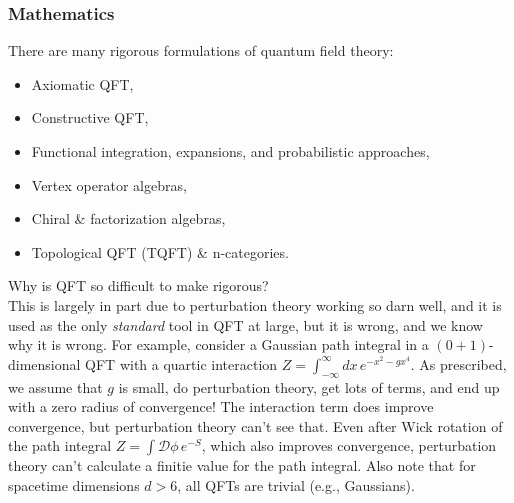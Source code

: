 \subsubsection*{Mathematics}

\noindent There are many rigorous formulations of quantum field theory:

\begin{itemize}
\item Axiomatic QFT,
\item Constructive QFT,
\item Functional integration, expansions, and probabilistic approaches,
\item Vertex operator algebras,
\item Chiral \& factorization algebras,
\item Topological QFT (TQFT) \& n-categories.
\end{itemize}

\noindent Why is QFT so difficult to make rigorous? \\

\noindent This is largely in part due to perturbation theory working so darn well, and it is used as the only \textit{standard} tool in QFT at large, but it is wrong, and we know why it is wrong. For example, consider a Gaussian path integral in a $(0+1)$-dimensional QFT with a quartic interaction $Z = \int_{-\infty}^\infty dx \, e^{-x^2 - g x^4}$. As prescribed, we assume that $g$ is small, do perturbation theory, get lots of terms, and end up with a zero radius of convergence! The interaction term does improve convergence, but perturbation theory can't see that. Even after Wick rotation of the path integral $Z = \int \mathcal{D} \phi \, e^{-S}$, which also improves convergence, perturbation theory can't calculate a finitie value for the path integral. Also note that for spacetime dimensions $d>6$, all QFTs are trivial (e.g., Gaussians). \\

